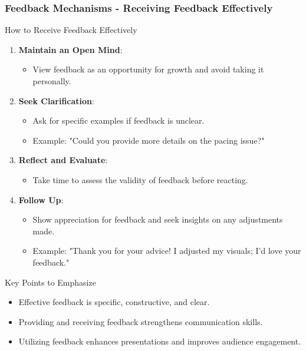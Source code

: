 \documentclass[aspectratio=169]{beamer}
\begin{document}
\begin{frame}[fragile]
    \frametitle{Feedback Mechanisms - Receiving Feedback Effectively}
    \begin{block}{How to Receive Feedback Effectively}
        \begin{enumerate}
            \item \textbf{Maintain an Open Mind}:
                \begin{itemize}
                    \item View feedback as an opportunity for growth and avoid taking it personally.
                \end{itemize}
            \item \textbf{Seek Clarification}:
                \begin{itemize}
                    \item Ask for specific examples if feedback is unclear.
                    \item Example: "Could you provide more details on the pacing issue?"
                \end{itemize}
            \item \textbf{Reflect and Evaluate}:
                \begin{itemize}
                    \item Take time to assess the validity of feedback before reacting.
                \end{itemize}
            \item \textbf{Follow Up}:
                \begin{itemize}
                    \item Show appreciation for feedback and seek insights on any adjustments made.
                    \item Example: "Thank you for your advice! I adjusted my visuals; I'd love your feedback."
                \end{itemize}
        \end{enumerate}
    \end{block}

    \begin{block}{Key Points to Emphasize}
        \begin{itemize}
            \item Effective feedback is specific, constructive, and clear.
            \item Providing and receiving feedback strengthens communication skills.
            \item Utilizing feedback enhances presentations and improves audience engagement.
        \end{itemize}
    \end{block}
\end{frame}
\end{document}
